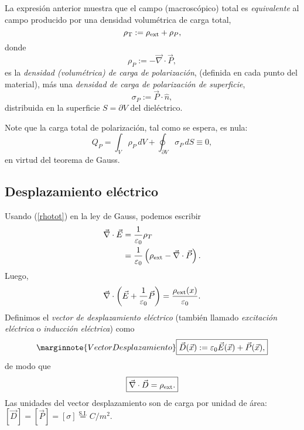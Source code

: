 La expresión anterior muestra que el campo (macroscópico) total es
\textit{equivalente} al campo producido por una densidad volumétrica de carga total,
\begin{equation}
\rho_{\rm T}:=\rho_{\rm ext}+\rho_P, \label{rhotot}
\end{equation}
donde
\begin{equation}
\boxed{\rho_P:=-\vec{\nabla}\cdot\vec{P},}
\end{equation}
es la \textit{densidad (volumétrica) de carga de polarización}, (definida en cada punto del material), más una
\textit{densidad de carga de polarización de superficie},
\begin{equation}
\boxed{\sigma_P:=\vec{P}\cdot\hat{n},}
\end{equation}
distribuida en la superficie $S=\partial V$ del dieléctrico.

Note que la carga total de polarización, tal como se espera, es nula:
\begin{equation}
 Q_P=\int_V\rho_P\,dV+\oint_{\partial V} \sigma_P\,dS\equiv 0,
\end{equation}
en virtud del teorema de Gauss.

\subsection{Desplazamiento eléctrico}
Usando (\ref{rhotot}) en la ley de Gauss, podemos escribir
\begin{align*}
\vec\nabla\cdot\vec{E} &=\frac{1}{\varepsilon_0}\rho_T \\
&=\frac{1}{\varepsilon_0}\left( \rho_{\rm ext}-\vec\nabla\cdot\vec{P}\right).
\end{align*}
Luego,
\begin{equation}
 \vec\nabla\cdot\left(\vec{E}+\frac{1}{\varepsilon_0}\vec{P}\right)=\frac{\rho_{
\rm ext}(x)}{\varepsilon_0}.
\end{equation}
Definimos el \textit{vector de desplazamiento eléctrico} (también llamado
\textit{excitación eléctrica} o \textit{inducción eléctrica}) como
\begin{equation}\marginnote{Vector Desplazamiento}
 \boxed{\vec{D}(\vec{x}):=\varepsilon_0\vec{E}(\vec{x})+\vec{P}(\vec{x}),} \label{defD}
\end{equation}
de modo que
\begin{equation}
\boxed{\vec{\nabla}\cdot\vec{D}=\rho_{\rm ext}.} \label{divD}
\end{equation}
Las unidades del vector desplazamiento son de carga por unidad de área: 
$[\vec{D}]=[\vec{P}]=[\sigma]\stackrel{\text{
S.I.}}{=}{C}/{m^2}$.


